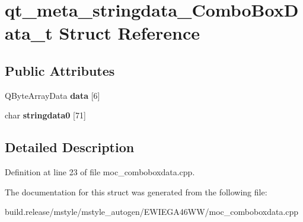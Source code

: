 \hypertarget{structqt__meta__stringdata___combo_box_data__t}{}\section{qt\+\_\+meta\+\_\+stringdata\+\_\+\+Combo\+Box\+Data\+\_\+t Struct Reference}
\label{structqt__meta__stringdata___combo_box_data__t}
\subsection*{Public Attributes}
\begin{DoxyCompactItemize}
\item 
\mbox{\label{structqt__meta__stringdata___combo_box_data__t_a8a9e9574ef16a4101ccd5ecfd8122222}} 
Q\+Byte\+Array\+Data {\bfseries data} \mbox{[}6\mbox{]}
\item 
\mbox{\label{structqt__meta__stringdata___combo_box_data__t_ad77054c0052c363380f6ad2925bdbd0c}} 
char {\bfseries stringdata0} \mbox{[}71\mbox{]}
\end{DoxyCompactItemize}


\subsection{Detailed Description}


Definition at line 23 of file moc\+\_\+comboboxdata.\+cpp.



The documentation for this struct was generated from the following file\+:\begin{DoxyCompactItemize}
\item 
build.\+release/mstyle/mstyle\+\_\+autogen/\+E\+W\+I\+E\+G\+A46\+W\+W/moc\+\_\+comboboxdata.\+cpp\end{DoxyCompactItemize}
